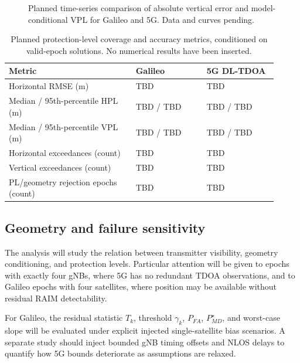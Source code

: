 \documentclass[pdflatex,sn-mathphys-num]{sn-jnl}
\begin{document}
\begin{figure}[t]
\centering
{}
\caption{Planned time-series comparison of absolute vertical error and
model-conditional VPL for Galileo and 5G. Data and curves pending.}
\label{fig:vertical-placeholder}
\end{figure}

\begin{table}[t]
\caption{Planned protection-level coverage and accuracy metrics, conditioned
on valid-epoch solutions. No numerical results have been inserted.}
\label{tab:pl-results}
\begin{tabular}{@{}p{0.43\linewidth}p{0.24\linewidth}p{0.24\linewidth}@{}}
\toprule
Metric & Galileo & 5G DL-TDOA\\
\midrule
Horizontal RMSE (m) & TBD & TBD\\
Median / 95th-percentile HPL (m) & TBD / TBD & TBD / TBD\\
Median / 95th-percentile VPL (m) & TBD / TBD & TBD / TBD\\
Horizontal exceedances (count) & TBD & TBD\\
Vertical exceedances (count) & TBD & TBD\\
PL/geometry rejection epochs (count) & TBD & TBD\\
\bottomrule
\end{tabular}
\end{table}

\subsection{Geometry and failure sensitivity}

The analysis will study the relation between transmitter visibility,
geometry conditioning, and protection levels. Particular attention will
be given to epochs with exactly four gNBs, where 5G has no redundant
TDOA observations, and to Galileo epochs with four satellites, where
position may be available without residual RAIM detectability.

For Galileo, the residual statistic $T_k$, threshold $\gamma_k$,
$P_{FA}$, $P_{MD}^{\star}$, and worst-case slope will be evaluated under
explicit injected single-satellite bias scenarios. A separate study
should inject bounded gNB timing offsets and NLOS delays to quantify
how 5G bounds deteriorate as assumptions are relaxed.
\end{document}
